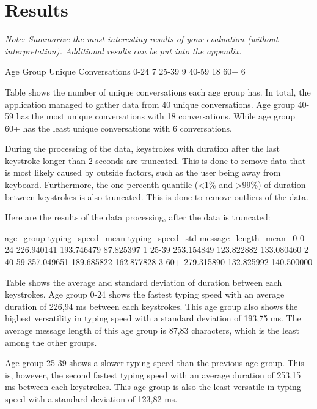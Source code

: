 \section{Results}

\textit{Note: Summarize the most interesting results of your evaluation (without interpretation). Additional results can be put into the appendix.}

Age Group  Unique Conversations
     0-24                     7
    25-39                     9
    40-59                    18
      60+                     6

Table shows the number of unique conversations each age group has.
In total, the application managed to gather data from 40 unique conversations.
Age group 40-59 has the most unique conversations with 18 conversations.
While age group 60+ has the least unique conversations with 6 conversations.

During the processing of the data, keystrokes with duration after the last keystroke longer than 2 seconds are truncated.
This is done to remove data that is most likely caused by outside factors, such as the user being away from keyboard.
Furthermore, the one-percenth quantile (<1\% and >99\%) of duration between keystrokes is also truncated.
This is done to remove outliers of the data.

Here are the results of the data processing, after the data is truncated:

age_group  typing_speed_mean  typing_speed_std  message_length_mean  \
0      0-24         226.940141        193.746479            87.825397   
1     25-39         253.154849        123.822882           133.080460   
2     40-59         357.049651        189.685822           162.877828   
3       60+         279.315890        132.825992           140.500000   

Table shows the average and standard deviation of duration between each keystrokes.
Age group 0-24 shows the fastest typing speed with an average duration of 226,94 ms between each keystrokes.
This age group also shows the highest versatility in typing speed with a standard deviation of 193,75 ms.
The average message length of this age group is 87,83 characters, which is the least among the other groups.

Age group 25-39 shows a slower typing speed than the previous age group.
This is, however, the second fastest typing speed with an average duration of 253,15 ms between each keystrokes.
This age group is also the least versatile in typing speed with a standard deviation of 123,82 ms.

